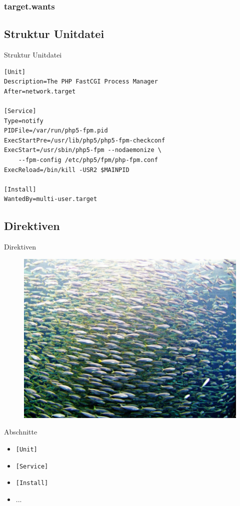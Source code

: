\subsubsection{target.wants}

\subsection{Struktur Unitdatei}

\begin{frame}[fragile]{Struktur Unitdatei}
 \begin{lstlisting}
[Unit]
Description=The PHP FastCGI Process Manager
After=network.target

[Service]
Type=notify
PIDFile=/var/run/php5-fpm.pid
ExecStartPre=/usr/lib/php5/php5-fpm-checkconf
ExecStart=/usr/sbin/php5-fpm --nodaemonize \
    --fpm-config /etc/php5/fpm/php-fpm.conf
ExecReload=/bin/kill -USR2 $MAINPID

[Install]
WantedBy=multi-user.target
\end{lstlisting}
\end{frame}

\subsection{Direktiven}

\begin{frame}{Direktiven}
  \begin{figure}[!ht]
     \centering
     \includegraphics[width=0.8\linewidth]{img/fish-22646_1920.jpg}
  \end{figure}
\end{frame}

\begin{frame}[fragile]{Abschnitte}
	\begin{itemize}
		\item \verb|[Unit]|
		\item \verb|[Service]|
		\item \verb|[Install]|
	        \item ...

	\end{itemize}	
\end{frame}

